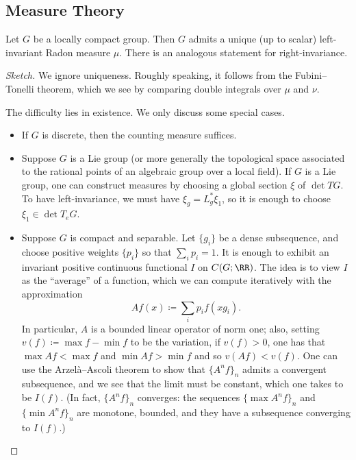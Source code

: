 \documentclass{article}
\begin{document}
\subsection{Measure Theory}
\begin{theorem}[Haar]
	Let $G$ be a locally compact group. Then $G$ admits a unique (up to scalar) left-invariant Radon measure $\mu$. There is an analogous statement for right-invariance.
\end{theorem}
\begin{proof}[Sketch]
	We ignore uniqueness. Roughly speaking, it follows from the Fubini--Tonelli theorem, which we see by comparing double integrals over $\mu$ and $\nu$.\todo{}

	The difficulty lies in existence. We only discuss some special cases.
	\begin{itemize}
		\item If $G$ is discrete, then the counting measure suffices.
		\item Suppose $G$ is a Lie group (or more generally the topological space associated to the rational points of an algebraic group over a local field). If $G$ is a Lie group, one can construct measures by choosing a global section $\xi$ of $\det TG$. To have left-invariance, we must have $\xi_g=L_g^*\xi_1$, so it is enough to choose $\xi_1\in\det T_eG$.
		\item Suppose $G$ is compact and separable. Let $\{g_i\}$ be a dense subsequence, and choose positive weights $\{p_i\}$ so that $\sum_ip_i=1$. It is enough to exhibit an invariant positive continuous functional $I$ on $C(G;\RR)$. The idea is to view $I$ as the ``average'' of a function, which we can compute iteratively with the approximation
		\[Af(x)\coloneqq\sum_ip_if(xg_i).\]
		In particular, $A$ is a bounded linear operator of norm one; also, setting $v(f)\coloneqq\max f-\min f$ to be the variation, if $v(f)>0$, one has that $\max Af<\max f$ and $\min Af>\min f$ and so $v(Af)<v(f)$. One can use the Arzel\`a--Ascoli theorem to show that $\{A^nf\}_n$ admits a convergent subsequence, and we see that the limit must be constant, which one takes to be $I(f)$. (In fact, $\{A^nf\}_n$ converges: the sequences $\{\max A^nf\}_n$ and $\{\min A^nf\}_n$ are monotone, bounded, and they have a subsequence converging to $I(f)$.) %
		\qedhere
	\end{itemize}
\end{proof}
\end{document}
